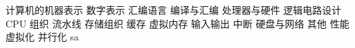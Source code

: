 \markdownRendererUlBeginTight
\markdownRendererUlItem 计算机的机器表示\markdownRendererInterblockSeparator
{}\markdownRendererUlBeginTight
\markdownRendererUlItem 数字表示\markdownRendererUlItemEnd 
\markdownRendererUlItem 汇编语言\markdownRendererUlItemEnd 
\markdownRendererUlItem 编译与汇编\markdownRendererUlItemEnd 
\markdownRendererUlEndTight \markdownRendererUlItemEnd 
\markdownRendererUlItem 处理器与硬件\markdownRendererInterblockSeparator
{}\markdownRendererUlBeginTight
\markdownRendererUlItem 逻辑电路设计\markdownRendererUlItemEnd 
\markdownRendererUlItem CPU 组织\markdownRendererUlItemEnd 
\markdownRendererUlItem 流水线\markdownRendererUlItemEnd 
\markdownRendererUlEndTight \markdownRendererUlItemEnd 
\markdownRendererUlItem 存储组织\markdownRendererInterblockSeparator
{}\markdownRendererUlBeginTight
\markdownRendererUlItem 缓存\markdownRendererUlItemEnd 
\markdownRendererUlItem 虚拟内存\markdownRendererUlItemEnd 
\markdownRendererUlEndTight \markdownRendererUlItemEnd 
\markdownRendererUlItem 输入输出\markdownRendererInterblockSeparator
{}\markdownRendererUlBeginTight
\markdownRendererUlItem 中断\markdownRendererUlItemEnd 
\markdownRendererUlItem 硬盘与网络\markdownRendererUlItemEnd 
\markdownRendererUlEndTight \markdownRendererUlItemEnd 
\markdownRendererUlItem 其他\markdownRendererInterblockSeparator
{}\markdownRendererUlBeginTight
\markdownRendererUlItem 性能\markdownRendererUlItemEnd 
\markdownRendererUlItem 虚拟化\markdownRendererUlItemEnd 
\markdownRendererUlItem 并行化\markdownRendererInterblockSeparator
{}\markdownRendererUlBeginTight
\markdownRendererUlItem sa\markdownRendererUlItemEnd 
\markdownRendererUlEndTight \markdownRendererUlItemEnd 
\markdownRendererUlEndTight \markdownRendererUlItemEnd 
\markdownRendererUlEndTight \relax